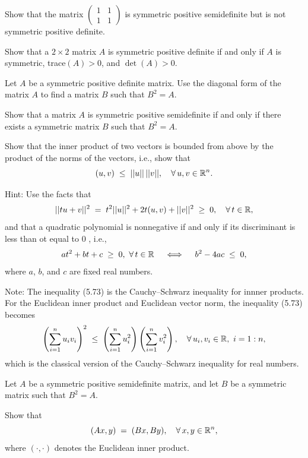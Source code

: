 \begin{exercises}

\item Show that the matrix $\begin{pmatrix} 1 & 1\\ 1 & 1 \end{pmatrix}$ is symmetric
positive semidefinite but is not symmetric positive definite.

\item Show that a $2 \times 2$ matrix $A$ is symmetric positive definite if and only
if $A$ is symmetric, trace$(A) > 0$, and $\det(A) > 0$.

\item Let $A$ be a symmetric positive definite matrix. Use the diagonal form of the
matrix $A$ to find a matrix $B$ such that $B^2 = A$.

\item Show that a matrix $A$ is symmetric positive semidefinite if and only if there
exists a symmetric matrix $B$ such that $B^2 = A$.

\item Show that the inner product of two vectors is bounded from above by the
product of the norms of the vectors, i.e., show that
\begin{equation}
(u,v) \;\leq\; ||u||\, ||v||, \quad \forall\, u,v \in \mathbb{R}^n.
\end{equation}

\noindent Hint: Use the facts that
\[
||tu+v||^2 \;=\; t^2||u||^2 + 2t(u,v) + ||v||^2 \;\geq\; 0, \quad \forall\, t \in \mathbb{R},
\]
and that a quadratic polynomial is nonnegative if and only if its discriminant
is less than ot equal to 0 , i.e.,
\[
at^2 + bt + c \;\geq\; 0, \ \forall\, t \in \mathbb{R} \quad \iff \quad b^2 - 4ac \;\leq\; 0,
\]
where $a$, $b$, and $c$ are fixed real numbers.

\noindent Note: The inequality (5.73) is the Cauchy--Schwarz inequality for innner
products. For the Euclidean inner product and Euclidean vector norm, the inequality
(5.73) becomes
\[
\left(\sum_{i=1}^{n} u_iv_i\right)^2 \;\leq\; \left(\sum_{i=1}^{n} u_i^2\right)
\left(\sum_{i=1}^{n} v_i^2\right), \quad \forall\, u_i,v_i \in \mathbb{R}, \ i = 1:n,
\]
which is the classical version of the Cauchy--Schwarz inequality for real numbers.

\item Let $A$ be a symmetric positive semidefinite matrix, and let $B$ be a symmetric
matrix such that $B^2 = A$.
\begin{subparts}
\item Show that
\begin{equation}
(Ax,y) \;=\; (Bx,By), \quad \forall\, x,y \in \mathbb{R}^n,
\end{equation}
where $(\cdot,\cdot)$ denotes the Euclidean inner product.


\end{subparts}
\end{exercises}
